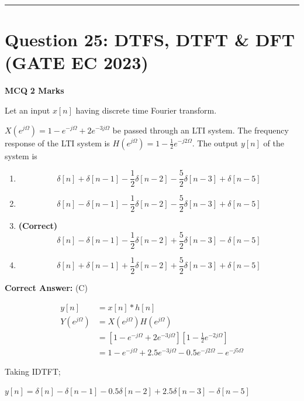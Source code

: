 \documentclass[11pt,a4paper]{article}
\begin{document}
\vspace{1.5em}
\hrule
\vspace{1.5em}

\section*{Question 25: DTFS, DTFT \& DFT (GATE EC 2023)}
\noindent \textbf{\color{primary}MCQ} \hfill \textbf{\color{secondary}2 Marks}


\noindent Let an input $x[n]$ having discrete time Fourier transform.

$X\left(e^{j \Omega}\right)=1-e^{-j \Omega}+2 e^{-3 j \Omega}$ be passed through an LTI system. The frequency response of the LTI system is $H\left(e^{j \Omega}\right)=1-\frac{1}{2} e^{-j 2 \Omega}$. The output $y[n]$ of the system is


\begin{enumerate}[label=(\Alph*)]
    \item \[
\delta[n]+\delta[n-1]-\frac{1}{2} \delta[n-2]-\frac{5}{2} \delta[n-3]+\delta[n-5]
\]
    \item \[
\delta[n]-\delta[n-1]-\frac{1}{2} \delta[n-2]-\frac{5}{2} \delta[n-3]+\delta[n-5]
\]
    \item \textbf{(Correct)} \[
\delta[n]-\delta[n-1]-\frac{1}{2} \delta[n-2]+\frac{5}{2} \delta[n-3]-\delta[n-5]
\]
    \item \[
\delta[n]+\delta[n-1]+\frac{1}{2} \delta[n-2]+\frac{5}{2} \delta[n-3]+\delta[n-5]
\]
\end{enumerate}

\noindent \textbf{Correct Answer:} (C)

\begin{tcolorbox}[solbox, title=Detailed Solution -- Question 25]
\[
\begin{aligned}
y[n] & =x[n] * h[n] \\
Y\left(e^{j \Omega}\right) & =X\left(e^{j \Omega}\right) H\left(e^{j \Omega}\right) \\
& =\left[1-e^{-j \Omega}+2 e^{-3 j \Omega}\right]\left[1-\frac{1}{2} e^{-2 j \Omega}\right] \\
& =1-e^{-j \Omega}+2.5 e^{-3 j \Omega}-0.5 e^{-j 2 \Omega}-e^{-j 5 \Omega}
\end{aligned}
\]

Taking IDTFT;

$y[n]=\delta[n]-\delta[n-1]-0.5 \delta[n-2]+2.5 \delta[n-3]-\delta[n-5]$
\end{tcolorbox}
\end{document}
